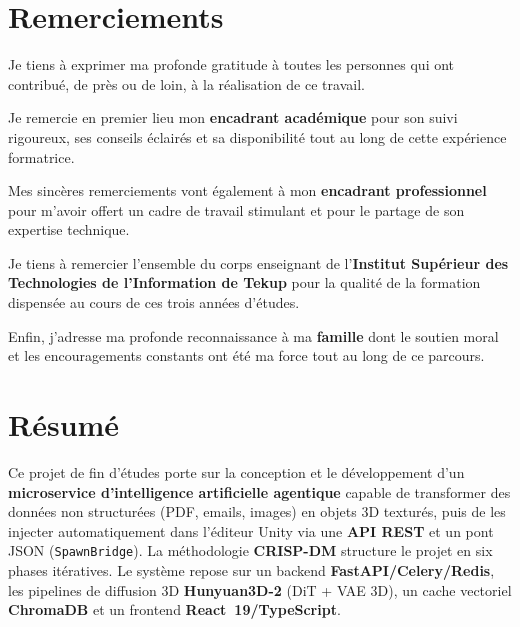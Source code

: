 \documentclass[12pt,a4paper,oneside]{report}
\begin{document}
\cleardoublepage
\chapter*{Remerciements}

Je tiens à exprimer ma profonde gratitude à toutes les personnes qui ont
contribué, de près ou de loin, à la réalisation de ce travail.

\medskip\noindent
Je remercie en premier lieu mon \textbf{encadrant académique} pour son
suivi rigoureux, ses conseils éclairés et sa disponibilité tout au long
de cette expérience formatrice.

\medskip\noindent
Mes sincères remerciements vont également à mon \textbf{encadrant
professionnel} pour m'avoir offert un cadre de travail stimulant et pour
le partage de son expertise technique.

\medskip\noindent
Je tiens à remercier l'ensemble du corps enseignant de l'\textbf{Institut
Supérieur des Technologies de l'Information de Tekup} pour la qualité de
la formation dispensée au cours de ces trois années d'études.

\medskip\noindent
Enfin, j'adresse ma profonde reconnaissance à ma \textbf{famille} dont le
soutien moral et les encouragements constants ont été ma force tout au long
de ce parcours.

\cleardoublepage
\chapter*{Résumé}

\noindent Ce projet de fin d'études porte sur la conception et le
développement d'un \textbf{microservice d'intelligence artificielle
agentique} capable de transformer des données non structurées (PDF,
emails, images) en objets 3D texturés, puis de les injecter automatiquement
dans l'éditeur Unity via une \textbf{API REST} et un pont JSON (\texttt{SpawnBridge}). La méthodologie \textbf{CRISP-DM} structure le projet en six
phases itératives. Le système repose sur un backend
\textbf{FastAPI/Celery/Redis}, les pipelines de diffusion 3D
\textbf{Hunyuan3D-2} (DiT + VAE 3D), un cache vectoriel \textbf{ChromaDB}
et un frontend \textbf{React~19/TypeScript}.
\end{document}
